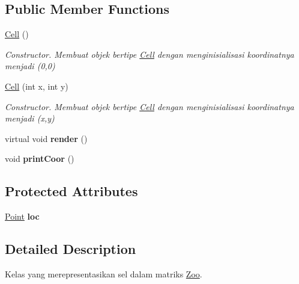 \subsection*{Public Member Functions}
\begin{DoxyCompactItemize}
\item 
\hyperlink{classCell_a394510643e8664cf12b5efaf5cb99f71}{Cell} ()\hypertarget{classCell_a394510643e8664cf12b5efaf5cb99f71}{}\label{classCell_a394510643e8664cf12b5efaf5cb99f71}

\begin{DoxyCompactList}\small\item\em Constructor. Membuat objek bertipe \hyperlink{classCell}{Cell} dengan menginisialisasi koordinatnya menjadi (0,0) \end{DoxyCompactList}\item 
\hyperlink{classCell_aa39ad04eeebb7bf00d592ad36640337e}{Cell} (int x, int y)
\begin{DoxyCompactList}\small\item\em Constructor. Membuat objek bertipe \hyperlink{classCell}{Cell} dengan menginisialisasi koordinatnya menjadi (x,y) \end{DoxyCompactList}\item 
virtual void {\bfseries render} ()\hypertarget{classCell_a3c55fdf9c9a14cd07e210a2a3fb102ac}{}\label{classCell_a3c55fdf9c9a14cd07e210a2a3fb102ac}

\item 
void {\bfseries print\+Coor} ()\hypertarget{classCell_a184dee133b16168d2ea242d20db79576}{}\label{classCell_a184dee133b16168d2ea242d20db79576}

\end{DoxyCompactItemize}
\subsection*{Protected Attributes}
\begin{DoxyCompactItemize}
\item 
\hyperlink{classPoint}{Point} {\bfseries loc}\hypertarget{classCell_a6955983511c6709d8f5b82b4ba6edb77}{}\label{classCell_a6955983511c6709d8f5b82b4ba6edb77}

\end{DoxyCompactItemize}


\subsection{Detailed Description}
Kelas yang merepresentasikan sel dalam matriks \hyperlink{classZoo}{Zoo}. 

